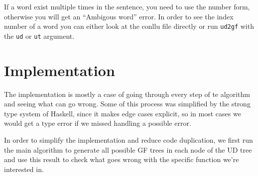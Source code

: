 If a word exist multiple times in the sentence, you need to use the number form, otherwise you will get an ``Ambigous word'' error. In order to see the index number of a word you can either look at the conllu file directly or run \verb|ud2gf| with the \verb|ud| or \verb|ut| argument.


\section{Implementation}

The implementation is mostly a case of going through every step of te algorithm and seeing what can go wrong. Some of this process was simplified by the strong type system of Haskell, since it makes edge cases explicit, so in most cases we would get a type error if we missed handling a possible error.

In order to simplify the implementation and reduce code duplication, we first run the main algorithm to generate all possible GF trees in each node of the UD tree and use this result to check what goes wrong with the specific function we're interested in.


